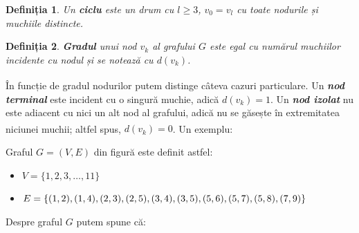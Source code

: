 \documentclass[9pt,a4paper]{report}
\newtheorem{definitie}{Definiția}
\begin{document}
\begin{definitie}
    Un \textbf{ciclu} este un drum cu $l \geq 3$, $v_0 = v_l$ cu toate nodurile și muchiile distincte.
\end{definitie}

\begin{definitie}
    \textbf{Gradul} unui nod $v_k$ al grafului $G$ este egal cu numărul muchiilor incidente cu nodul și se notează cu $d(v_k)$.
\end{definitie}

În funcție de gradul nodurilor putem distinge câteva cazuri particulare\textsuperscript{\cite{milosescu}}. Un \textbf{\textit{nod terminal}} este incident cu o singură muchie, adică $d(v_k) = 1$. Un \textbf{\textit{nod izolat}} nu este adiacent cu nici un alt nod al grafului, adică nu se găsește în extremitatea niciunei muchii; altfel spus, $d(v_k) = 0$. Un exemplu\textsuperscript{\cite{milosescu}}:

\begin{center}
    \begin{minipage}[t]{0.5\textwidth}
        \vspace{0pt} %
        Graful $G = (V, E)$ din figură este definit astfel:
        \begin{itemize}
            \item $V = \{1, 2, 3, \dots, 11\}$
            \item $E = \{(1,2), (1,4), (2,3), (2,5), \\ (3,4), (3,5), (5,6), (5,7), (5,8), (7,9)\}$
        \end{itemize}
        Despre graful $G$ putem spune că:
    \end{minipage}
    \begin{minipage}[t]{0.49\textwidth}
        \vspace{0pt}
        \begin{flushright}
        \end{flushright}
    \end{minipage}
\end{center}
\end{document}
